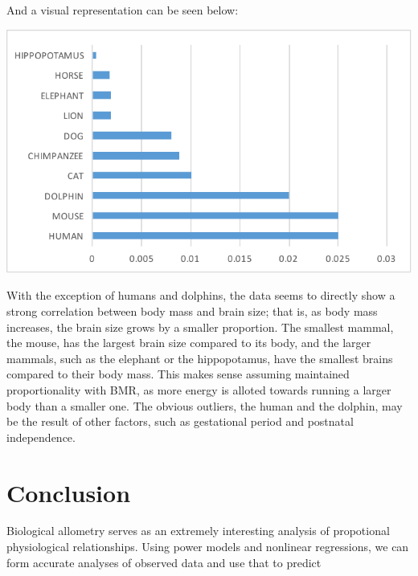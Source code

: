\documentclass[10pt,letterpaper]{article}
\begin{document}
			And a visual representation can be seen below:
			\newline \newline
			\centerline{\includegraphics{Picture10.pdf}}
			\newline \newline
			With the exception of humans and dolphins, the data seems to directly show a strong correlation between body mass and brain size; that is, as body mass increases, the brain size grows by a smaller proportion. The smallest mammal, the mouse, has the largest brain size compared to its body, and the larger mammals, such as the elephant or the hippopotamus, have the smallest brains compared to their body mass. This makes sense assuming maintained proportionality with BMR, as more energy is alloted towards running a larger body than a smaller one. The obvious outliers, the human and the dolphin, may be the result of other factors, such as gestational period and postnatal independence. 
	\section{Conclusion}
		Biological allometry serves as an extremely interesting analysis of propotional physiological relationships. Using power models and nonlinear regressions, we can form accurate analyses of observed data and use that to predict
\end{document}
